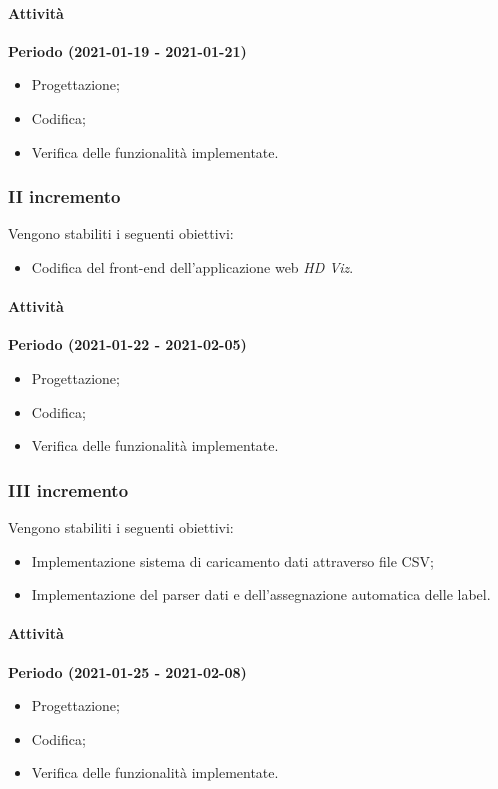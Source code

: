 \documentclass[../piano_di_progetto.tex]{subfiles}
\begin{document}
\paragraph{Attività}
\noindent\textbf{Periodo (2021-01-19 - 2021-01-21)}
\begin{itemize}
    \item Progettazione;
    \item Codifica;
    \item Verifica delle funzionalità implementate.
\end{itemize}

\subsubsection{II incremento}
Vengono stabiliti i seguenti obiettivi:
\begin{itemize}
    \item Codifica del front-end dell'applicazione web \emph{HD Viz}.
\end{itemize}
\paragraph{Attività}
\noindent\textbf{Periodo (2021-01-22 - 2021-02-05)}
\begin{itemize}
    \item Progettazione;
    \item Codifica;
    \item Verifica delle funzionalità implementate.
\end{itemize}

\subsubsection{III incremento}
Vengono stabiliti i seguenti obiettivi:
\begin{itemize}
    \item Implementazione sistema di caricamento dati attraverso file CSV;
    \item Implementazione del parser dati e dell'assegnazione automatica delle label.
\end{itemize}
\paragraph{Attività}
\noindent\textbf{Periodo (2021-01-25 - 2021-02-08)}
\begin{itemize}
    \item Progettazione;
    \item Codifica;
    \item Verifica delle funzionalità implementate.
\end{itemize}
\end{document}
